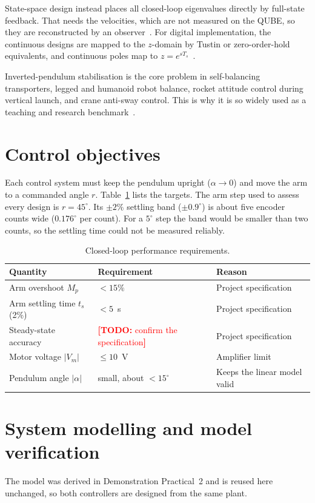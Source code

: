 \documentclass[11pt,a4paper]{article}
\newcommand{\todo}[1]{\textcolor{red}{\textbf{[TODO:} #1\textbf{]}}}
\begin{document}
State-space design instead places all closed-loop eigenvalues directly by
full-state feedback. That needs the velocities, which are not measured on
the QUBE, so they are reconstructed by an observer~\cite{aguilera2026,ogata}.
For digital implementation, the continuous designs are mapped to the
$z$-domain by Tustin or zero-order-hold equivalents, and continuous poles
map to $z=e^{sT_s}$~\cite{franklin_digital,mathworks_c2d}.

Inverted-pendulum stabilisation is the core problem in self-balancing
transporters, legged and humanoid robot balance, rocket attitude control
during vertical launch, and crane anti-sway control. This is why it is so
widely used as a teaching and research benchmark~\cite{ctms}.

\section{Control objectives}\label{sec:objectives}
Each control system must keep the pendulum upright ($\alpha\to0$) and move
the arm to a commanded angle $r$. Table~\ref{tab:specs} lists the targets.
The arm step used to assess every design is $r=45^\circ$. Its $\pm2\%$
settling band ($\pm0.9^\circ$) is about five encoder counts wide
($0.176^\circ$ per count). For a $5^\circ$ step the band would be smaller
than two counts, so the settling time could not be measured reliably.
\begin{table}[H]\centering
\caption{Closed-loop performance requirements.}\label{tab:specs}
\begin{tabular}{lll}
\toprule
\textbf{Quantity}&\textbf{Requirement}&\textbf{Reason}\\
\midrule
Arm overshoot $M_p$&$<15\%$&Project specification\\
Arm settling time $t_s$ (2\%)&$<5$~s&Project specification\\
Steady-state accuracy&\todo{confirm the specification}&Project specification\\
Motor voltage $|V_m|$&$\le10$~V&Amplifier limit~\cite{qube_manual}\\
Pendulum angle $|\alpha|$&small, about $<15^\circ$&Keeps the linear model valid\\
\bottomrule
\end{tabular}
\end{table}

\section{System modelling and model verification}\label{sec:model}
The model was derived in Demonstration Practical~2 and is reused here
unchanged, so both controllers are designed from the same plant.
\end{document}
